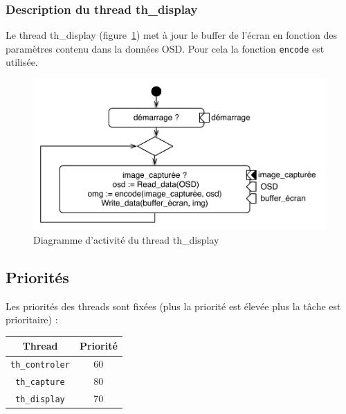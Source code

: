\documentclass[11pt, a4paper]{paper}
\begin{document}
\subsubsection{Description du thread th\_display}

Le thread th\_display (figure~\ref{fig:th_display}) met à jour le buffer de l'écran en fonction des paramètres contenu dans la données OSD. Pour cela la fonction {\tt encode} est utilisée.

\begin{figure}[htbp]
\label{fig:th_display}
\begin{center}
\parbox{9cm}{\includegraphics[scale=.5]{./figures-pdf/th_video.pdf}}\parbox{5cm}{\caption{Diagramme d'activité du thread th\_display}}
\end{center}
\end{figure}
\FloatBarrier

\subsection{Priorités}

Les priorités des threads sont fixées (plus la priorité est élevée plus la tâche est prioritaire) :

\begin{table}[ht]
\begin{center}
\begin{tabular}{|c|c|}
\hline
Thread & Priorité \\
\hline
{\tt th\_controler} & 60\\
\hline
{\tt th\_capture} & 80\\
\hline
{\tt th\_display} & 70\\
\hline
\end{tabular}
\end{center}
\end{table}%
\end{document}
